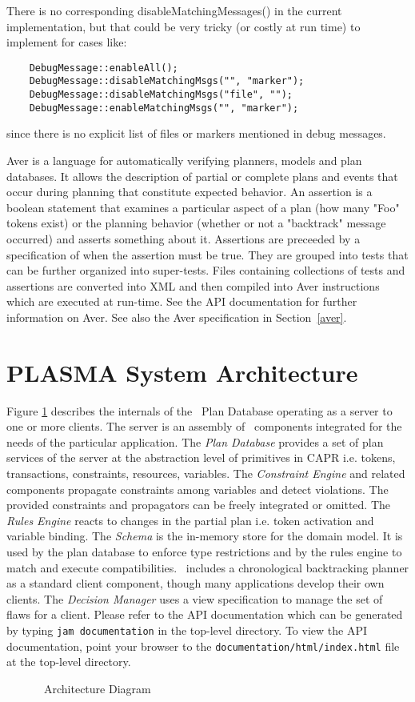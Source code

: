 \documentclass[10pt, letterpaper, twoside]{article}
\begin{document}
There is no corresponding disableMatchingMessages() in the current
implementation, but that could be very tricky (or costly at run time)
to implement for cases like:
\begin{verbatim}
	DebugMessage::enableAll();
	DebugMessage::disableMatchingMsgs("", "marker");
	DebugMessage::disableMatchingMsgs("file", "");
	DebugMessage::enableMatchingMsgs("", "marker");
\end{verbatim}
since there is no explicit list of files or markers mentioned in
debug messages.

Aver is a language for automatically verifying planners, models and plan
databases. It allows the description of partial or complete plans and
events that occur during planning that constitute expected behavior.  An
assertion is a boolean statement that examines a particular aspect of a
plan (how many "Foo" tokens exist) or the planning behavior (whether or not
a "backtrack" message occurred) and asserts something about it. Assertions
are preceeded by a specification of when the assertion must be true. They
are grouped into tests that can be further organized into
super-tests. Files containing collections of tests and assertions are
converted into XML and then compiled into Aver instructions which are
executed at run-time.  See the API documentation for further information on
Aver.  See also the Aver specification in Section~\ref{aver}.

\section{PLASMA System Architecture}

Figure \ref{SystemDiagram} describes the internals of the \ET\, Plan
Database operating as a server to one or more clients. The server is an
assembly of \ET\, components integrated for the needs of the particular
application. The {\em Plan Database} provides a set of plan services of the
server at the abstraction level of primitives in CAPR i.e. tokens,
transactions, constraints, resources, variables. The {\em Constraint
Engine} and related components propagate constraints among
variables and detect violations. The provided constraints and
propagators can be freely integrated or omitted. The {\em Rules Engine}
reacts to changes in the partial plan i.e. token activation and variable
binding. The {\em Schema} is the in-memory store for the domain model. It
is used by the plan database to enforce type restrictions and by the rules
engine to match and execute compatibilities.  \ET\, includes a chronological
backtracking planner as a standard client component, though many
applications develop their own clients. The {\em Decision Manager} uses a
view specification to manage the set of flaws for a client.  Please refer
to the API documentation which can be generated by typing {\tt jam
documentation} in the top-level directory.  To view the API documentation,
point your browser to the {\tt documentation/html/index.html} file at the
top-level directory.
\begin{figure}[htb]
\centering{}
\caption{\ET\, Architecture Diagram}
\label{SystemDiagram}
\end{figure}
\end{document}
